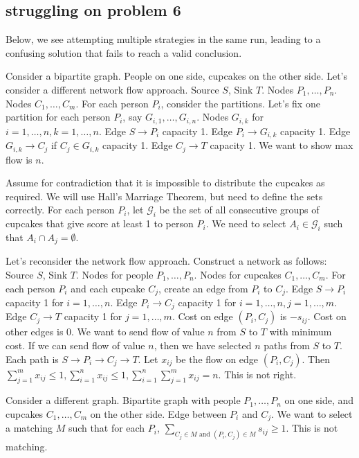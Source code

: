 \subsection{\flthink{} struggling on problem 6}
\label{app:flthink}
Below, we see \flthink{} attempting multiple strategies in the same run, leading to a confusing solution that fails to reach a valid conclusion.
\begin{geminils}{\geminiheader}
Consider a bipartite graph. People on one side, cupcakes on the other side.
Let's consider a different network flow approach.
Source $S$, Sink $T$. Nodes $P_1, \dots, P_n$. Nodes $C_1, \dots, C_m$.
For each person $P_i$, consider the partitions. Let's fix one partition for each person $P_i$, say $G_{i,1}, \dots, G_{i,n}$.
Nodes $G_{i,k}$ for $i=1, \dots, n, k=1, \dots, n$.
Edge $S \to P_i$ capacity 1. Edge $P_i \to G_{i,k}$ capacity 1. Edge $G_{i,k} \to C_j$ if $C_j \in G_{i,k}$ capacity 1. Edge $C_j \to T$ capacity 1.
We want to show max flow is $n$.

Assume for contradiction that it is impossible to distribute the cupcakes as required.
We will use Hall's Marriage Theorem, but need to define the sets correctly.
For each person $P_i$, let $\mathcal{G}_i$ be the set of all consecutive groups of cupcakes that give score at least 1 to person $P_i$. We need to select $A_i \in \mathcal{G}_i$ such that $A_i \cap A_j = \emptyset$.

Let's reconsider the network flow approach. Construct a network as follows:
Source $S$, Sink $T$. Nodes for people $P_1, \dots, P_n$. Nodes for cupcakes $C_1, \dots, C_m$.
For each person $P_i$ and each cupcake $C_j$, create an edge from $P_i$ to $C_j$.
Edge $S \to P_i$ capacity 1 for $i=1, \dots, n$. Edge $P_i \to C_j$ capacity 1 for $i=1, \dots, n, j=1, \dots, m$. Edge $C_j \to T$ capacity 1 for $j=1, \dots, m$.
Cost on edge $(P_i, C_j)$ is $-s_{ij}$. Cost on other edges is 0.
We want to send flow of value $n$ from $S$ to $T$ with minimum cost.
If we can send flow of value $n$, then we have selected $n$ paths from $S$ to $T$. Each path is $S \to P_i \to C_j \to T$. Let $x_{ij}$ be the flow on edge $(P_i, C_j)$. Then $\sum_{j=1}^m x_{ij} \leq 1, \sum_{i=1}^n x_{ij} \leq 1, \sum_{i=1}^n \sum_{j=1}^m x_{ij} = n$. This is not right.

Consider a different graph. Bipartite graph with people $P_1, \dots, P_n$ on one side, and cupcakes $C_1, \dots, C_m$ on the other side. Edge between $P_i$ and $C_j$. We want to select a matching $M$ such that for each $P_i$, $\sum_{C_j \in M \text{ and } (P_i, C_j) \in M} s_{ij} \geq 1$. This is not matching.


\end{geminils}
